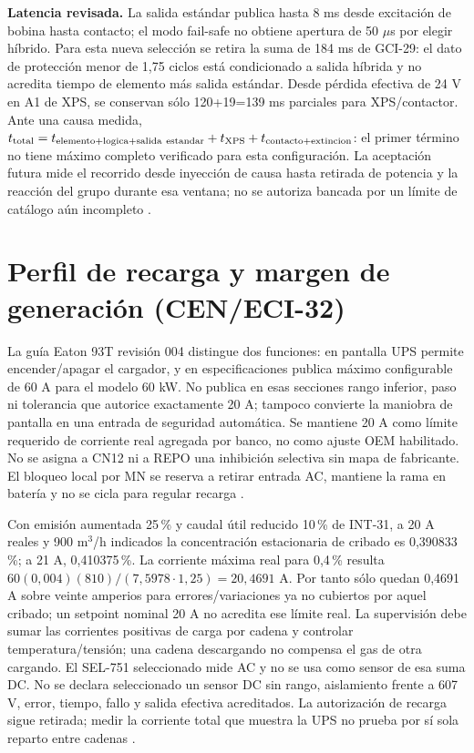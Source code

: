 \textbf{Latencia revisada.} La salida estándar publica hasta 8 ms desde excitación de bobina hasta contacto; el modo fail-safe no obtiene apertura de 50 $\mu$s por elegir híbrido. Para esta nueva selección se retira la suma de 184 ms de GCI-29: el dato de protección menor de 1,75 ciclos está condicionado a salida híbrida y no acredita tiempo de elemento más salida estándar. Desde pérdida efectiva de 24 V en A1 de XPS, se conservan sólo 120+19=139 ms parciales para XPS/contactor. Ante una causa medida, $t_{\rm total}=t_{\rm elemento+logica+salida\ estandar}+t_{\rm XPS}+t_{\rm contacto+extincion}$: el primer término no tiene máximo completo verificado para esta configuración. La aceptación futura mide el recorrido desde inyección de causa hasta retirada de potencia y la reacción del grupo durante esa ventana; no se autoriza bancada por un límite de catálogo aún incompleto \parencites[p.~34 y pp.~38--40]{lote29-sel751}[pp.~2.30 y 4.200]{lote32-selmanual2024}[p.~45]{lote26-xpsmanual}[p.~2]{lote26-contactor}.

\section{Perfil de recarga y margen de generación (CEN/ECI-32)}
\label{sec:sd4-recarga-cen32}
La guía Eaton 93T revisión 004 distingue dos funciones: en pantalla UPS permite encender/apagar el cargador, y en especificaciones publica máximo configurable de 60 A para el modelo 60 kW. No publica en esas secciones rango inferior, paso ni tolerancia que autorice exactamente 20 A; tampoco convierte la maniobra de pantalla en una entrada de seguridad automática. Se mantiene 20 A como límite requerido de corriente real agregada por banco, no como ajuste OEM habilitado. No se asigna a CN12 ni a REPO una inhibición selectiva sin mapa de fabricante. El bloqueo local por MN se reserva a retirar entrada AC, mantiene la rama en batería y no se cicla para regular recarga \parencite[pp.~69--70 y 98]{p7-eaton-93t-guia}.

Con emisión aumentada 25\,\% y caudal útil reducido 10\,\% de INT-31, a 20 A reales y 900 m$^3$/h indicados la concentración estacionaria de cribado es 0,390833\,\%; a 21 A, 0,410375\,\%. La corriente máxima real para 0,4\,\% resulta $60(0,004)(810)/(7,5978\cdot1,25)=20,4691$ A. Por tanto sólo quedan 0,4691 A sobre veinte amperios para errores/variaciones ya no cubiertos por aquel cribado; un setpoint nominal 20 A no acredita ese límite real. La supervisión debe sumar las corrientes positivas de carga por cadena y controlar temperatura/tensión; una cadena descargando no compensa el gas de otra cargando. El SEL-751 seleccionado mide AC y no se usa como sensor de esa suma DC. No se declara seleccionado un sensor DC sin rango, aislamiento frente a 607 V, error, tiempo, fallo y salida efectiva acreditados. La autorización de recarga sigue retirada; medir la corriente total que muestra la UPS no prueba por sí sola reparto entre cadenas \parencite[pp.~97--98]{p7-eaton-93t-guia}.

